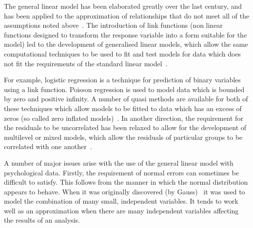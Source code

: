 

The general linear model has been elaborated greatly over the last century, and has been applied to the approximation of relationships that do not meet all of the assumptions noted above~\cite{gelman2007data}. The introduction of link functions (non linear functions designed to transform the response variable into a form suitable for the model)  led to the development of generalised linear models, which allow the same computational techniques to be used to fit and test models for data which does not fit the requirements of the standard linear model~\cite{mccullagh1989generalized}.

For example, logistic regression is a technique for prediction of binary
 variables using a link function. Poisson regression is used to model data
 which is bounded by zero and positive infinity. A number of quasi methods
 are available for both of these techniques which allow models to be fitted
 to  data which has an excess of zeros (so called zero inflated models)~\cite{gelman2007data,venables2002modern}. In another direction, the
 requirement for the residuals to be uncorrelated has been relaxed to allow for the development of multilevel or mixed models, which allow the residuals of particular groups to be correlated with one another~\cite{gelman2007data}. 

A number of major issues arise with the use of the general linear model with psychological data. Firstly, the requirement of normal errors can sometimes be difficult to satisfy. This follows from the manner in which the normal distribution appears to behave. When it was originally discovered (by Gauss)~\cite{stigler1986history} it was used to model the combination of many small, independent variables. It tends to work well as an approximation when there are many independent variables affecting the results of an analysis.

